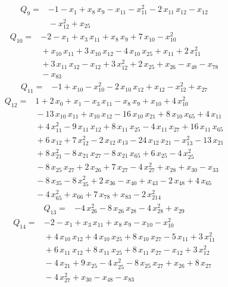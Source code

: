 \documentclass[11pt]{article}
\theoremstyle{definition}\newtheorem{definition}[theorem]{Definition}
\begin{document}
\begin{align*}
Q_{9}={}&-1-x_{1}+x_{8}\,x_{9}-x_{11}-x_{11}^{2}-2\,x_{11}\,x_{12}-x_{12}
\\ &{}-x_{12}^{2}+x_{25}
\end{align*}
\begin{align*}
Q_{10}={}&-2-x_{1}+x_{3}\,x_{11}+x_{8}\,x_{9}+7\,x_{10}-x_{10}^{2}
\\ &{}+x_{10}\,x_{11}+3\,x_{10}\,x_{12}-4\,x_{10}\,x_{25}+x_{11}+2\,x_{11}^{2}
\\ &{}+3\,x_{11}\,x_{12}-x_{12}+3\,x_{12}^{2}+2\,x_{25}+x_{26}-x_{48}-x_{78}
\\ &{}-x_{83}
\end{align*}
\begin{align*}
Q_{11}={}&-1+x_{10}-x_{10}^{2}-2\,x_{10}\,x_{12}+x_{12}-x_{12}^{2}+x_{27}
\end{align*}
\begin{align*}
Q_{12}={}&1+2\,x_{0}+x_{1}-x_{3}\,x_{11}-x_{8}\,x_{9}+x_{10}+4\,x_{10}^{2}
\\ &{}-13\,x_{10}\,x_{11}+x_{10}\,x_{12}-16\,x_{10}\,x_{21}+8\,x_{10}\,x_{65}+4\,x_{11}
\\ &{}+4\,x_{11}^{2}-9\,x_{11}\,x_{12}+8\,x_{11}\,x_{25}-4\,x_{11}\,x_{27}+16\,x_{11}\,x_{65}
\\ &{}+6\,x_{12}+7\,x_{12}^{2}-2\,x_{12}\,x_{13}-24\,x_{12}\,x_{21}-x_{13}^{2}-13\,x_{21}
\\ &{}+8\,x_{21}^{2}-8\,x_{21}\,x_{27}-8\,x_{21}\,x_{65}+6\,x_{25}-4\,x_{25}^{2}
\\ &{}-8\,x_{25}\,x_{27}+2\,x_{26}+7\,x_{27}-4\,x_{27}^{2}+x_{28}+x_{30}-x_{33}
\\ &{}-8\,x_{35}-8\,x_{35}^{2}+2\,x_{36}-x_{40}+x_{43}-2\,x_{48}+4\,x_{65}
\\ &{}-4\,x_{65}^{2}+x_{66}+7\,x_{78}+x_{83}-2\,x_{214}^{2}
\end{align*}
\begin{align*}
Q_{13}={}&-4\,x_{26}^{2}-8\,x_{26}\,x_{28}-4\,x_{28}^{2}+x_{29}
\end{align*}
\begin{align*}
Q_{14}={}&-2-x_{1}+x_{3}\,x_{11}+x_{8}\,x_{9}-x_{10}-x_{10}^{2}
\\ &{}+4\,x_{10}\,x_{12}+4\,x_{10}\,x_{25}+8\,x_{10}\,x_{27}-5\,x_{11}+3\,x_{11}^{2}
\\ &{}+6\,x_{11}\,x_{12}+8\,x_{11}\,x_{25}+8\,x_{11}\,x_{27}-x_{12}+3\,x_{12}^{2}
\\ &{}-4\,x_{21}+9\,x_{25}-4\,x_{25}^{2}-8\,x_{25}\,x_{27}+x_{26}+8\,x_{27}
\\ &{}-4\,x_{27}^{2}+x_{30}-x_{48}-x_{83}
\end{align*}
\end{document}
